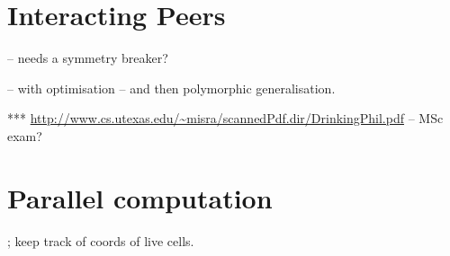 \documentclass[fleqn,12pt]{article}
\begin{document}

\section{Interacting Peers}




 -- needs a symmetry breaker?

 -- with
optimisation -- and then polymorphic generalisation.

 ***
\url{http://www.cs.utexas.edu/~misra/scannedPdf.dir/DrinkingPhil.pdf} -- MSc
exam? 



\section{Parallel computation}








; keep track of coords of live cells.





\end{document}
